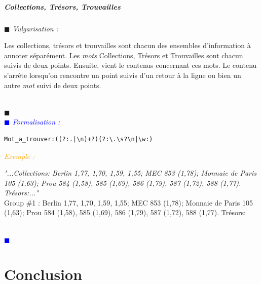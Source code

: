 \documentclass[a4paper, 11pt]{report}
\newenvironment{vulgarisation}
    {
    \textit{\textcolor{dark-blue}{$\blacksquare$  Vulgarisation : \\}}

    }
    {
    ~\\\textcolor{dark-blue}{$\blacksquare$}\\
    }
\newenvironment{formalisation}
    {
    \textit{\textcolor{blue}{$\blacksquare$  Formalisation : \\}}
    }
    {
    ~\\\textcolor{blue}{$\blacksquare$}\\
    }
\newenvironment{exemple}
    {
    \textit{\textcolor{orange}{
    Exemple : \\}}
    }
    {\\
    }
\begin{document}
\subsubsection{Collections, Trésors, Trouvailles}
\begin{vulgarisation}
Les collections, trésors et trouvailles sont chacun des ensembles d'information à annoter séparément.
	Les \textit{mots} Collections, Trésors et Trouvailles sont chacun suivis de deux points. Ensuite, vient le contenus concernant ces mots. Le contenu s'arrête lorsqu'on rencontre un point suivis d'un retour à la ligne ou bien un autre \textit{mot} suivi de deux points.
\end{vulgarisation}
\begin{formalisation}
	\begin{verbatim}
Mot_a_trouver:((?:.|\n)+?)(?:\.\s?\n|\w:)
	\end{verbatim}
	\begin{exemple}
		\emph{"...Collections: Berlin 1,77, 1,70, 1,59,
			1,55; MEC 853 (1,78); Monnaie de Paris 105 (1,63); Prou 584 (1,58), 585 (1,69), 586 (1,79), 587 
			(1,72), 588 (1,77). Trésors:..."}\\
		Group \#1 :  Berlin 1,77, 1,70, 1,59,
		1,55; MEC 853 (1,78); Monnaie de Paris 105 (1,63); Prou 584 (1,58), 585 (1,69), 586 (1,79), 587 (1,72), 588 (1,77). Trésors:
	\end{exemple}
\end{formalisation}


\part{Conclusion}
\end{document}
